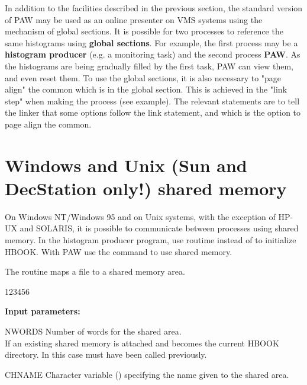 In addition to the facilities described in the previous section,
the standard version of PAW may be used as an online presenter
on VMS systems using the mechanism of global sections.
It is possible for two processes to reference the same histograms
using {\bf global sections}.
For example, the first process may be a {\bf histogram producer}
(e.g. a monitoring task) and the second process  {\bf PAW}.
As the
histograms are being gradually filled by the first task, PAW can
view them, and even reset them.
To use the global sections, it is also necessary to "page align" the common
which is in the global section. This is achieved in the "link step" when making
the process (see example).
The relevant statements are 
to tell the linker that some options follow the link statement,
and  which is the option to
page align the  common.

\newpage

\section{Windows and Unix (Sun and DecStation only!) shared memory}
\label{sec:unixshared}

On Windows NT/Windows 95 and on Unix systems, with the exception of 
HP-UX and SOLARIS, 
%
it is possible to communicate between processes using shared memory.
In the histogram producer program, use routime  instead
of  to initialize HBOOK.  With PAW use the
command  to use shared memory.


\Action
The routine maps a file to a shared memory area.

\begin{DLtt}{123456}
\item[{\rm\bf Input parameters:}]
\item[NWORDS] Number of words for the shared area.\\
              If  an existing
              shared memory is attached and becomes
              the current HBOOK directory. 
              In this case  must have been called previously.
\item[CHNAME] Character variable () specifying the name
              given to the shared area.
\end{DLtt}

